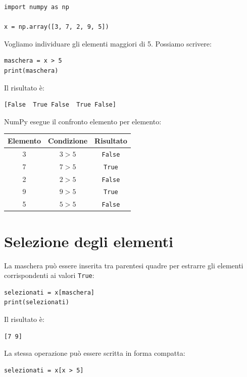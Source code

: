 \documentclass[11pt,a4paper]{book}
\begin{document}
\begin{lstlisting}
import numpy as np

x = np.array([3, 7, 2, 9, 5])
\end{lstlisting}

Vogliamo individuare gli elementi maggiori di 5. Possiamo scrivere:

\begin{lstlisting}
maschera = x > 5
print(maschera)
\end{lstlisting}

Il risultato è:

\begin{lstlisting}
[False  True False  True False]
\end{lstlisting}

NumPy esegue il confronto elemento per elemento:

\begin{center}
\begin{tabular}{ccc}
\toprule
Elemento & Condizione & Risultato \\
\midrule
3 & $3>5$ & \texttt{False} \\
7 & $7>5$ & \texttt{True} \\
2 & $2>5$ & \texttt{False} \\
9 & $9>5$ & \texttt{True} \\
5 & $5>5$ & \texttt{False} \\
\bottomrule
\end{tabular}
\end{center}

\section{Selezione degli elementi}

La maschera può essere inserita tra parentesi quadre per estrarre gli elementi corrispondenti ai valori \texttt{True}:

\begin{lstlisting}
selezionati = x[maschera]
print(selezionati)
\end{lstlisting}

Il risultato è:

\begin{lstlisting}
[7 9]
\end{lstlisting}

La stessa operazione può essere scritta in forma compatta:

\begin{lstlisting}
selezionati = x[x > 5]
\end{lstlisting}
\end{document}
